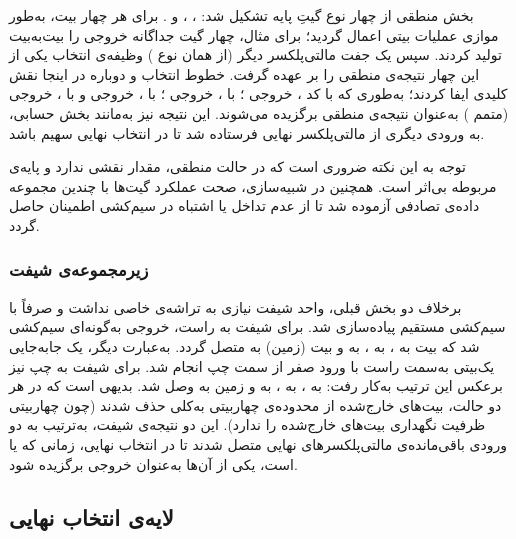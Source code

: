 \documentclass[a4paper,12pt]{article}
\numberwithin{figure}{subsection}
\begin{document}
بخش منطقی از چهار نوع گیتِ پایه تشکیل شد:  ،  ،   و  . برای هر چهار بیت، به‌طور موازی عملیات بیتی اعمال گردید؛ برای مثال، چهار گیت  جداگانه خروجی  را بیت‌به‌بیت تولید کردند. سپس یک جفت مالتی‌پلکسر دیگر (از همان نوع ) وظیفه‌ی انتخاب یکی از این چهار نتیجه‌ی منطقی را بر عهده گرفت. خطوط انتخاب  و  دوباره در اینجا نقش کلیدی ایفا کردند؛ به‌طوری که با کد ، خروجی ؛ با ، خروجی ؛ با ، خروجی  و با ، خروجی  (متمم ) به‌عنوان نتیجه‌ی منطقی برگزیده می‌شوند. این نتیجه نیز به‌مانند بخش حسابی، به ورودی دیگری از مالتی‌پلکسر نهایی فرستاده شد تا در انتخاب نهایی سهیم باشد.

توجه به این نکته ضروری است که در حالت منطقی، مقدار  نقشی ندارد و پایه‌ی مربوطه بی‌اثر است. همچنین در شبیه‌سازی، صحت عملکرد گیت‌ها با چندین مجموعه داده‌ی تصادفی آزموده شد تا از عدم تداخل یا اشتباه در سیم‌کشی اطمینان حاصل گردد.

\subsubsection*{زیرمجموعه‌ی شیفت}
\leavevmode\par
\vspace{0.2cm}


برخلاف دو بخش قبلی، واحد شیفت نیازی به تراشه‌ی خاصی نداشت و صرفاً با سیم‌کشی مستقیم پیاده‌سازی شد. برای شیفت به راست، خروجی  به‌گونه‌ای سیم‌کشی شد که بیت  به ،  به ،  به  و بیت  (زمین) به  متصل گردد. به‌عبارت دیگر، یک جابه‌جایی یک‌بیتی به‌سمت راست با ورود صفر از سمت چپ انجام شد. برای شیفت به چپ نیز برعکس این ترتیب به‌کار رفت:  به ،  به ،  به  و زمین به  وصل شد. بدیهی است که در هر دو حالت، بیت‌های خارج‌شده از محدوده‌ی چهاربیتی به‌کلی حذف شدند (چون  چهاربیتی ظرفیت نگهداری بیت‌های خارج‌شده را ندارد). این دو نتیجه‌ی شیفت، به‌ترتیب به دو ورودی باقی‌مانده‌ی مالتی‌پلکسرهای نهایی متصل شدند تا در انتخاب نهایی، زمانی که  یا  است، یکی از آن‌ها به‌عنوان خروجی برگزیده شود.

\subsection*{لایه‌ی انتخاب نهایی}
\leavevmode\par
\vspace{0.2cm}
\end{document}
